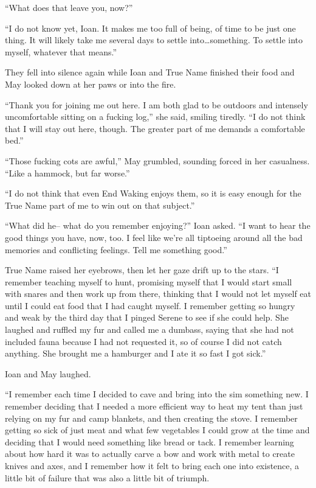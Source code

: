 ``What does that leave you, now?''

``I do not know yet, Ioan. It makes me too full of being, of time to be just one thing. It will likely take me several days to settle into\ldots something. To settle into myself, whatever that means.''

They fell into silence again while Ioan and True Name finished their food and May looked down at her paws or into the fire.

``Thank you for joining me out here. I am both glad to be outdoors and intensely uncomfortable sitting on a fucking log,'' she said, smiling tiredly. ``I do not think that I will stay out here, though. The greater part of me demands a comfortable bed.''

``Those fucking cots are awful,'' May grumbled, sounding forced in her casualness. ``Like a hammock, but far worse.''

``I do not think that even End Waking enjoys them, so it is easy enough for the True Name part of me to win out on that subject.''

``What did he-- what do you remember enjoying?'' Ioan asked. ``I want to hear the good things you have, now, too. I feel like we're all tiptoeing around all the bad memories and conflicting feelings. Tell me something good.''

True Name raised her eyebrows, then let her gaze drift up to the stars. ``I remember teaching myself to hunt, promising myself that I would start small with snares and then work up from there, thinking that I would not let myself eat until I could eat food that I had caught myself. I remember getting so hungry and weak by the third day that I pinged Serene to see if she could help. She laughed and ruffled my fur and called me a dumbass, saying that she had not included fauna because I had not requested it, so of course I did not catch anything. She brought me a hamburger and I ate it so fast I got sick.''

Ioan and May laughed.

``I remember each time I decided to cave and bring into the sim something new. I remember deciding that I needed a more efficient way to heat my tent than just relying on my fur and camp blankets, and then creating the stove. I remember getting so sick of just meat and what few vegetables I could grow at the time and deciding that I would need something like bread or tack. I remember learning about how hard it was to actually carve a bow and work with metal to create knives and axes, and I remember how it felt to bring each one into existence, a little bit of failure that was also a little bit of triumph.

